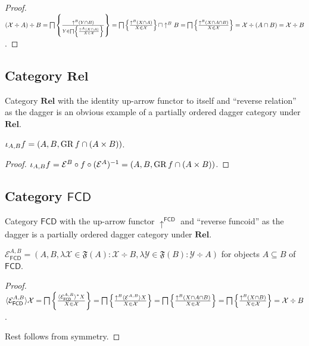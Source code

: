 \begin{proof}
  $(\mathcal{X} \div A) \div B = \bigsqcap \left\{ \frac{ \uparrow^B  (Y \cap B)
  }{ Y \in \bigsqcap \left\{ \frac{ \uparrow^A  (X \cap A)}{X \in \mathcal{X} }\right\} \mathcal{} }\right\} =
  \bigsqcap \left\{ \frac{ \uparrow^B  (X \cap A) }{ X \in
  \mathcal{X} }\right\} \sqcap \uparrow^B B = \bigsqcap \left\{ \frac{ \uparrow^B  (X
  \cap A \cap B) }{ X \in \mathcal{X} }\right\} =
  \mathcal{X} \div (A \cap B) = \mathcal{X} \div B$.
\end{proof}

\subsection{\texorpdfstring{Category $\mathbf{Rel}$}{Category Rel}}

Category $\mathbf{Rel}$ with the identity up-arrow functor to itself
and ``reverse relation'' as the dagger is an obvious example of a partially
ordered dagger category under $\mathbf{Rel}$.

\begin{prop}
  $\iota_{A, B} f = (A , B , \operatorname{GR} f \cap (A \times B))$.
\end{prop}

\begin{proof}
  $\iota_{A, B} f = \mathcal{E}^{B} \circ f \circ (\mathcal{E}^{A})^{-1} = (A , B , \operatorname{GR} f \cap (A \times B))$.
\end{proof}

\subsection{\texorpdfstring{Category $\mathsf{FCD}$}{Category FCD}}

Category $\mathsf{FCD}$ with the up-arrow functor
$\uparrow^{\mathsf{FCD}}$ and ``reverse funcoid'' as the dagger is a
partially ordered dagger category under $\mathbf{Rel}$.

\begin{prop}
  $\mathcal{E}_{\mathsf{FCD}}^{A,B} = (A , B , \lambda \mathcal{X}
  \in \mathfrak{F} (A) : \mathcal{X} \div B , \lambda \mathcal{Y} \in
  \mathfrak{F} (B) : \mathcal{Y} \div A)$ for objects $A \subseteq B$ of
  $\mathsf{FCD}$.
\end{prop}

\begin{proof}
  $\langle \mathcal{E}_{\mathsf{FCD}}^{A,B} \rangle \mathcal{X} =
  \bigsqcap \left\{ \frac{ \langle \mathcal{E}_{\mathsf{FCD}}^{A,B}
  \rangle^{\ast} X }{ X \in \mathcal{X} }\right\} =
  \bigsqcap \left\{ \frac{ \uparrow^B  \langle \mathcal{E}^{A,B} \rangle X
  }{ X \in \mathcal{X} }\right\} = \bigsqcap \left\{ \frac{
  \uparrow^B  (X \cap A \cap B) }{ X \in \mathcal{X}
  }\right\} = \bigsqcap \left\{ \frac{ \uparrow^B  (X \cap B) }{
  X \in \mathcal{X} }\right\} = \mathcal{X} \div B$.
  
  Rest follows from symmetry.
\end{proof}

